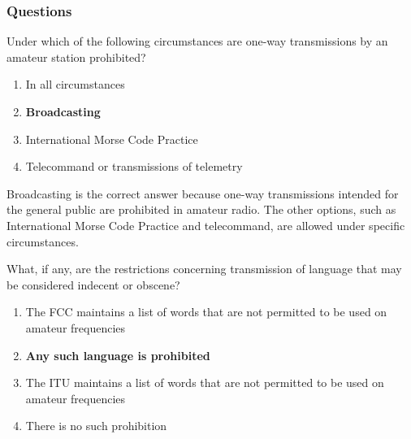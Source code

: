 

\subsubsection*{Questions}

\begin{tcolorbox}[colback=gray!10!white,colframe=black!75!black,title={T1D02}]
Under which of the following circumstances are one-way transmissions by an amateur station prohibited?
\begin{enumerate}[label=\Alph*),noitemsep]
    \item In all circumstances
    \item \textbf{Broadcasting}
    \item International Morse Code Practice
    \item Telecommand or transmissions of telemetry
\end{enumerate}
\end{tcolorbox}

Broadcasting is the correct answer because one-way transmissions intended for the general public are prohibited in amateur radio. The other options, such as International Morse Code Practice and telecommand, are allowed under specific circumstances.

\begin{tcolorbox}[colback=gray!10!white,colframe=black!75!black,title={T1D06}]
What, if any, are the restrictions concerning transmission of language that may be considered indecent or obscene?
\begin{enumerate}[label=\Alph*),noitemsep]
    \item The FCC maintains a list of words that are not permitted to be used on amateur frequencies
    \item \textbf{Any such language is prohibited}
    \item The ITU maintains a list of words that are not permitted to be used on amateur frequencies
    \item There is no such prohibition
\end{enumerate}
\end{tcolorbox}

